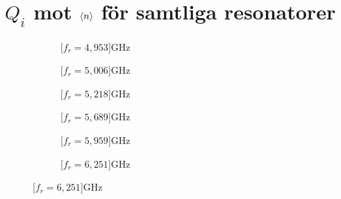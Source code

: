\documentclass[../../main.tex]{subfiles}
\begin{document}
\chapter{$Q_i$ mot $\expval{n}$ för samtliga resonatorer}
\label{app:data}




\begin{figure}[H]
    \begin{subfigure}{0.33\textwidth}
        \centering
        \setlength{}
        \setlength\figureheight{10em}
        
        \caption{\unit[$f_r=4,953$]{GHz}}
    \end{subfigure}
    \begin{subfigure}{0.33\textwidth}
        \centering
        \setlength{}
        \setlength\figureheight{10em}
        
        \caption{\unit[$f_r=5,006$]{GHz}}
    \end{subfigure}
    \begin{subfigure}{0.33\textwidth}
        \centering
        \setlength{}
        \setlength\figureheight{10em}
        
        \caption{\unit[$f_r=5,218$]{GHz}}
    \end{subfigure}

    \begin{subfigure}{0.33\textwidth}
        \centering
        \setlength{}
        \setlength\figureheight{10em}
        
        \caption{\unit[$f_r=5,689$]{GHz}}
    \end{subfigure}
    \begin{subfigure}{0.33\textwidth}
        \centering
        \setlength{}
        \setlength\figureheight{10em}
        
        \caption{\unit[$f_r=5,959$]{GHz}}
    \end{subfigure}
    \begin{subfigure}{0.33\textwidth}
        \centering
        \setlength{}
        \setlength\figureheight{10em}
        
        \caption{\unit[$f_r=6,251$]{GHz}}
    \end{subfigure}


\end{figure}
\end{document}
